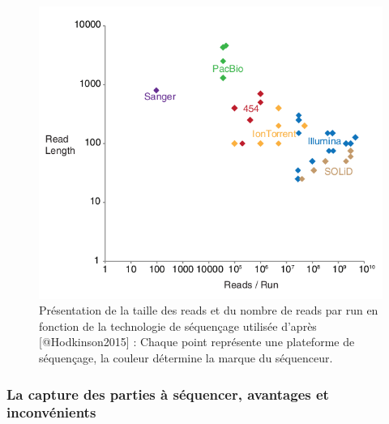 \documentclass[12pt,twoside]{reedthesis}
\theoremstyle{definition}
\theoremstyle{definition}
\theoremstyle{remark}
\begin{document}
  \begin{figure}
  
  {\centering \includegraphics[scale=.55]{figure/read_per_run} 
  
  }
  
  \caption[Présentation de la taille des reads et du nombre de reads par run en fonction de la technologie de séquençage utilisée]{Présentation de la taille des reads et du nombre de reads par run en fonction de la technologie de séquençage utilisée d'après [@Hodkinson2015] : Chaque point représente une plateforme de séquençage, la couleur détermine la marque du séquenceur.}\label{fig:readPerRun}
  \end{figure}
  
  \subsubsection{La capture des parties à séquencer, avantages et
  inconvénients}\label{la-capture-des-parties-a-sequencer-avantages-et-inconvenients}
  
\end{document}
